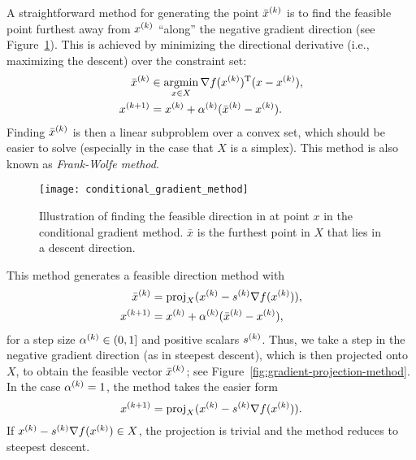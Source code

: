 \documentclass{article}
\begin{document}
\label{s:conditional-gradient-method}

A straightforward method for generating the point \(\kth{\bar{x}}\) is to find the feasible point
furthest away from \(\kth{x}\) ``along'' the negative gradient direction (see
Figure~\ref{fig:conditional-gradient-method}).  This is achieved by minimizing the directional
derivative (i.e., maximizing the descent) over the constraint set:
\begin{align*}
  \kth{\bar{x}} &\in \argmin_{x \in X} \T{\nabla f(\kth{x})}(x - \kth{x}), \\
  \kth[k+1]{x} &= \kth{x} + \kth{\alpha}(\kth{\bar{x}} - \kth{x}).
\end{align*}
Finding \(\kth{\bar{x}}\) is then a linear subproblem over a convex set, which should be easier to
solve (especially in the case that \(X\) is a simplex).  This method is also known as
\emph{Frank-Wolfe method}.

\begin{figure}[H]
  \centering
  \texttt{[image: conditional\_gradient\_method]}
  \caption{Illustration of finding the feasible direction in at point \(x\) in the conditional
    gradient method. \(\bar{x}\) is the furthest point in \(X\) that lies in a descent
    direction.\label{fig:conditional-gradient-method}}
\end{figure}

\label{s:gradient-projection-method}

This method generates a feasible direction method with
\begin{align*}
  \kth{\bar{x}} &= \proj_X (\kth{x} - \kth{s} \nabla f(\kth{x})), \\
  \kth[k+1]{x} &= \kth{x} + \kth{\alpha}(\kth{\bar{x}} - \kth{x}),
\end{align*}
for a step size \(\kth{\alpha} \in (0, 1]\) and positive scalars \(\kth{s}\).  Thus, we take a step
in the negative gradient direction (as in steepest descent), which is then projected onto \(X\), to
obtain the feasible vector \(\kth{\bar{x}}\); see Figure~\ref{fig:gradient-projection-method}.  In
the case \(\kth{\alpha} = 1\), the method takes the easier form
\begin{equation*}
  \kth[k+1]{x} = \proj_X (\kth{x} - \kth{s} \nabla f(\kth{x})).
\end{equation*}
If \(\kth{x} - \kth{s} \nabla f(\kth{x}) \in X\), the projection is trivial and the method reduces
to steepest descent.
\end{document}
